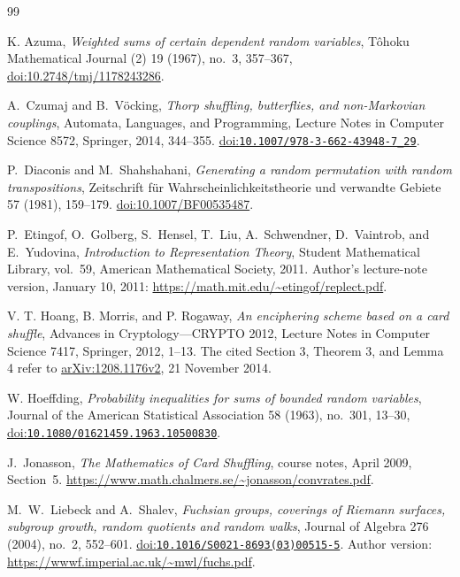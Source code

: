 \begin{thebibliography}{99}

K. Azuma,
\emph{Weighted sums of certain dependent random variables},
T\^ohoku Mathematical Journal (2) 19 (1967), no.~3, 357--367,
\href{https://doi.org/10.2748/tmj/1178243286}{doi:10.2748/tmj/1178243286}.

A.~Czumaj and B.~V\"ocking,
\emph{Thorp shuffling, butterflies, and non-Markovian couplings},
Automata, Languages, and Programming,
Lecture Notes in Computer Science 8572, Springer, 2014, 344--355.
\href{https://doi.org/10.1007/978-3-662-43948-7_29}
{doi:\nolinkurl{10.1007/978-3-662-43948-7_29}}.

P.~Diaconis and M.~Shahshahani,
\emph{Generating a random permutation with random transpositions},
Zeitschrift f\"ur Wahrscheinlichkeitstheorie und verwandte Gebiete
57 (1981), 159--179.
\href{https://doi.org/10.1007/BF00535487}{doi:10.1007/BF00535487}.

P.~Etingof, O.~Golberg, S.~Hensel, T.~Liu, A.~Schwendner,
D.~Vaintrob, and E.~Yudovina,
\emph{Introduction to Representation Theory},
Student Mathematical Library, vol.~59, American Mathematical Society,
2011.
Author's lecture-note version, January 10, 2011:
\url{https://math.mit.edu/~etingof/replect.pdf}.

V. T. Hoang, B. Morris, and P. Rogaway,
\emph{An enciphering scheme based on a card shuffle},
Advances in Cryptology---CRYPTO 2012,
Lecture Notes in Computer Science 7417, Springer, 2012, 1--13.
The cited Section 3, Theorem 3, and Lemma 4 refer to
\href{https://arxiv.org/abs/1208.1176v2}{arXiv:1208.1176v2},
21 November 2014.

W. Hoeffding,
\emph{Probability inequalities for sums of bounded random variables},
Journal of the American Statistical Association 58 (1963), no.~301, 13--30,
\href{https://doi.org/10.1080/01621459.1963.10500830}{doi:\nolinkurl{10.1080/01621459.1963.10500830}}.

J.~Jonasson,
\emph{The Mathematics of Card Shuffling},
course notes, April 2009, Section~5.
\url{https://www.math.chalmers.se/~jonasson/convrates.pdf}.

M.~W.~Liebeck and A.~Shalev,
\emph{Fuchsian groups, coverings of Riemann surfaces, subgroup growth,
random quotients and random walks},
Journal of Algebra 276 (2004), no.~2, 552--601.
\href{https://doi.org/10.1016/S0021-8693(03)00515-5}
{doi:\nolinkurl{10.1016/S0021-8693(03)00515-5}}.
Author version: \url{https://wwwf.imperial.ac.uk/~mwl/fuchs.pdf}.


\end{thebibliography}
